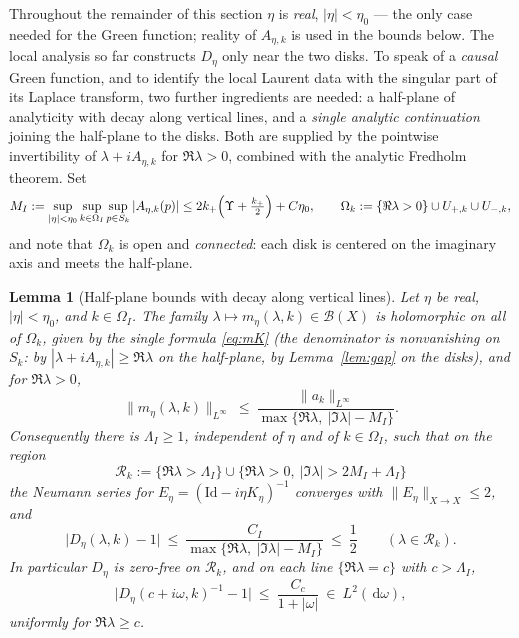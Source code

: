 \documentclass[11pt,a4paper]{amsart}
\newtheorem{lemma}[theorem]{Lemma}
\theoremstyle{definition}
\theoremstyle{remark}
\newcommand{\Id}{\mathrm{Id}}
\newcommand{\dd}{\,\mathrm{d}}
\begin{document}
Throughout the remainder of this section $\eta$ is \emph{real}, $|\eta|<\eta_0$ --- the only case needed for the Green function; reality of $A_{\eta,k}$ is used in the bounds below. The local analysis so far constructs $D_\eta$ only near the two disks. To speak of a \emph{causal} Green function, and to identify the local Laurent data with the singular part of its Laplace transform, two further ingredients are needed: a half-plane of analyticity with decay along vertical lines, and a \emph{single analytic continuation} joining the half-plane to the disks. Both are supplied by the pointwise invertibility of $\lambda+iA_{\eta,k}$ for $\Re\lambda>0$, combined with the analytic Fredholm theorem. Set
\[
M_I:=\sup_{|\eta|<\eta_0}\sup_{k\in\Omega_I}\sup_{p\in S_k}|A_{\eta,k}(p)|\le2k_+\Bigl(\Upsilon+\tfrac{k_+}{2}\Bigr)+C\eta_0,
\qquad
\Omega_k:=\{\Re\lambda>0\}\cup U_{+,k}\cup U_{-,k},
\]
and note that $\Omega_k$ is open and \emph{connected}: each disk is centered on the imaginary axis and meets the half-plane.

\begin{lemma}[Half-plane bounds with decay along vertical lines]\label{lem:halfplane}
Let $\eta$ be real, $|\eta|<\eta_0$, and $k\in\Omega_I$. The family $\lambda\mapsto m_\eta(\lambda,k)\in\mathcal B(X)$ is holomorphic on all of $\Omega_k$, given by the single formula \eqref{eq:mK} (the denominator is nonvanishing on $S_k$: by $|\lambda+iA_{\eta,k}|\ge\Re\lambda$ on the half-plane, by Lemma~\ref{lem:gap} on the disks), and for $\Re\lambda>0$,
\begin{equation}\label{eq:mdecay}
\|m_\eta(\lambda,k)\|_{L^\infty}\ \le\ \frac{\|a_k\|_{L^\infty}}{\max\{\Re\lambda,\ |\Im\lambda|-M_I\}} .
\end{equation}
Consequently there is $\Lambda_I\ge1$, independent of $\eta$ and of $k\in\Omega_I$, such that on the region
\[
\mathcal R_k:=\{\Re\lambda>\Lambda_I\}\cup\bigl\{\Re\lambda>0,\ |\Im\lambda|>2M_I+\Lambda_I\bigr\}
\]
the Neumann series for $E_\eta=(\Id-i\eta K_\eta)^{-1}$ converges with $\|E_\eta\|_{X\to X}\le2$, and
\begin{equation}\label{eq:Ddecay}
\bigl|D_\eta(\lambda,k)-1\bigr|\ \le\ \frac{C_I}{\max\{\Re\lambda,\ |\Im\lambda|-M_I\}}\ \le\ \frac12
\qquad(\lambda\in\mathcal R_k).
\end{equation}
In particular $D_\eta$ is zero-free on $\mathcal R_k$, and on each line $\{\Re\lambda=c\}$ with $c>\Lambda_I$,
\begin{equation}\label{eq:linedecay}
\bigl|D_\eta(c+i\omega,k)^{-1}-1\bigr|\ \le\ \frac{C_c}{1+|\omega|}\ \in\ L^2(\dd\omega),
\end{equation}
uniformly for $\Re\lambda\ge c$.
\end{lemma}
\end{document}
